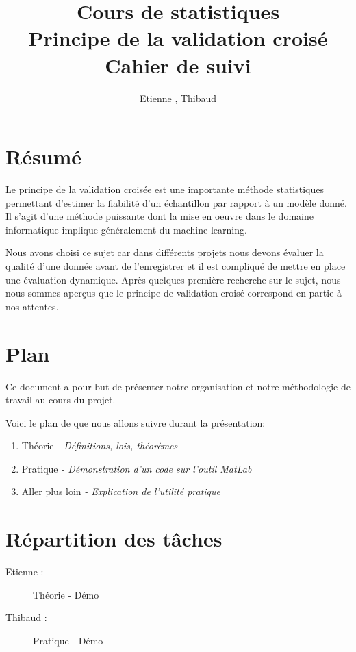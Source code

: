 \documentclass[a4paper, 12pt, french]{article}
\title{Cours de statistiques\\Principe de la validation croisé\\Cahier de suivi}
\author{Etienne \bsc{Batise}, Thibaud \bsc{Dauce}}
\begin{document}
   \maketitle 
   \section{Résumé} 
   Le principe de la validation croisée est une importante méthode statistiques permettant d'estimer la fiabilité d'un échantillon par rapport à un modèle donné. Il s'agit d'une méthode puissante dont la mise en oeuvre dans le domaine informatique implique généralement du machine-learning. 

   Nous avons choisi ce sujet car dans différents projets nous devons évaluer la qualité d'une donnée avant de l'enregistrer et il est compliqué de mettre en place une évaluation dynamique. Après quelques première recherche sur le sujet, nous nous sommes aperçus que le principe de validation croisé correspond en partie à nos attentes.

   \section{Plan} 
   Ce document a pour but de présenter notre organisation et notre méthodologie de travail au cours du projet. 

   Voici le plan de que nous allons suivre durant la présentation:
   \begin{enumerate}
       \item Théorie \textit{- Définitions, lois, théorèmes}
       \item Pratique \textit{- Démonstration d'un code sur l'outil MatLab}
       \item Aller plus loin \textit{- Explication de l'utilité pratique}
   \end{enumerate}
   
   \section{Répartition des tâches}

   \begin{description}
       \item[Etienne : ]Théorie - Démo
       \item[Thibaud : ]Pratique - Démo
   \end{description}
\end{document}
